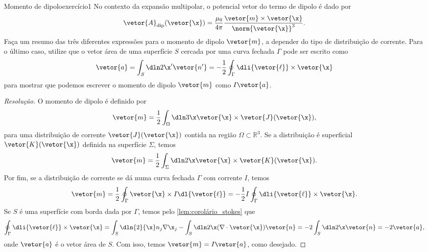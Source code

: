 \begin{exercício}{Momento de dipolo}{exercício1}
    No contexto da expansão multipolar, o potencial vetor do termo de dipolo é dado por
    \begin{equation*}
        \vetor{A}_{\mathrm{dip}}(\vetor{\x}) = \frac{\mu_0}{4\pi} \frac{\vetor{m}\times\vetor{\x}}{\norm{\vetor{\x}}^3}.
    \end{equation*}
    Faça um resumo das três diferentes expressões para o momento de dipolo \(\vetor{m}\), a depender do tipo de distribuição de corrente. Para o último caso, utilize que o vetor área de uma superfície \(S\) cercada por uma curva fechada \(\Gamma\) pode ser escrito como
    \begin{equation*}
        \vetor{a} = \int_S \dln2{\x'} \vetor{n'} =-\frac12 \oint_{\Gamma} \dli{\vetor{\ell}} \times \vetor{\x}
    \end{equation*}
    para mostrar que podemos escrever o momento de dipolo \(\vetor{m}\) como \(I\vetor{a}\).
\end{exercício}
\begin{proof}[Resolução]
    O momento de dipolo é definido por
    \begin{equation*}
        \vetor{m} = \frac12 \int_{\Omega} \dln3{\x} \vetor{\x}\times \vetor{J}(\vetor{\x}),
    \end{equation*}
    para uma distribuição de corrente \(\vetor{J}(\vetor{\x})\) contida na região \(\Omega \subset \mathbb{R}^3\). Se a distribuição é superficial \(\vetor{K}(\vetor{\x})\) definida na superfície \(\Sigma\), temos
    \begin{equation*}
        \vetor{m} = \frac12 \int_{\Sigma} \dln2{\x} \vetor{\x}\times \vetor{K}(\vetor{\x}).
    \end{equation*}
    Por fim, se a distribuição de corrente se dá numa curva fechada \(\Gamma\) com corrente \(I\), temos
    \begin{equation*}
        \vetor{m} = \frac12 \oint_{\Gamma} \vetor{\x} \times I\dl{\vetor{\ell}} = -\frac12 I\oint_{\Gamma} \dli{\vetor{\ell}}\times\vetor{\x}.
    \end{equation*}
    Se \(S\) é uma superfície com borda dada por \(\Gamma\), temos pelo \cref{lem:corolário_stokes} que
    \begin{equation*}
        \oint_{\Gamma} \dli{\vetor{\ell}} \times \vetor{\x} = \int_S \dln{2}{\x} n_j \nabla \x_j - \int_{S} \dln2\x (\nabla \cdot \vetor{\x})\vetor{n} = -2\int_S \dln2\x \vetor{n} = -2\vetor{a},
    \end{equation*}
    onde \(\vetor{a}\) é o vetor área de \(S\). Com isso, temos \(\vetor{m} = I\vetor{a}\), como desejado.
\end{proof}
